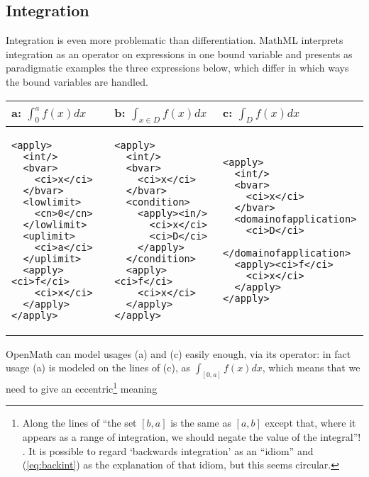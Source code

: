 \documentclass{llncs}
\begin{document}
\iffull\subsection{Integration}\fi

Integration is even more problematic than differentiation. MathML interprets integration
as an operator on expressions in one bound variable and presents as paradigmatic examples
the three expressions below, which differ in which ways the bound variables are handled.
\begin{center}
\lstset{frame=none,numbers=none,lineskip=-.7ex,aboveskip=-.5em,belowskip=-1em,language=MathML2}
\begin{tabular}{|p{3.3cm}|p{3.5cm}|p{3.8cm}|}\hline
  a: $\int_0^af(x) dx$ & b: $\int_{x\in D}f(x) dx$ & c: $\int_Df(x)dx$\\\hline
\begin{lstlisting}
<apply>
  <int/>
  <bvar>
    <ci>x</ci>
  </bvar>
  <lowlimit>
    <cn>0</cn>
  </lowlimit>
  <uplimit>
    <ci>a</ci>
  </uplimit>
  <apply><ci>f</ci>
    <ci>x</ci>
  </apply>
</apply>
\end{lstlisting}
&
\begin{lstlisting}[language=MathML2]
<apply>
  <int/>
  <bvar>
    <ci>x</ci>
  </bvar>
  <condition>
    <apply><in/>
      <ci>x</ci>
      <ci>D</ci>
    </apply>
  </condition>
  <apply><ci>f</ci>
    <ci>x</ci>
  </apply>
</apply>
\end{lstlisting}
&
\begin{lstlisting}[language=MathML2]
<apply>
  <int/>
  <bvar>
    <ci>x</ci>
  </bvar>
  <domainofapplication>
    <ci>D</ci>
  </domainofapplication>
  <apply><ci>f</ci>
    <ci>x</ci>
  </apply>
</apply>
\end{lstlisting}
\\\hline
\end{tabular}
\end{center}
OpenMath can model usages (a) and (c) easily enough, via its {} operator:
in fact usage (a) is modeled on the lines of (c), as $\int_{[0,a]}f(x) dx$, which means
that we need to give an eccentric\footnote{Along the lines of ``the set $[b,a]$ is the
  same as $[a,b]$ except that, where it appears as a range of integration, we should
  negate the value of the integral''! \cite{Kohlhase2008}. It is possible to regard
  `backwards integration' as an ``idiom'' \fi and
  (\ref{eq:backint}) as the explanation of that idiom, but this seems circular.} meaning
\end{document}
